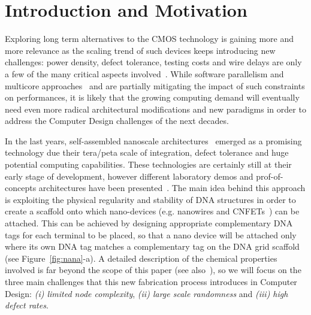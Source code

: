 
\section{Introduction and Motivation}

Exploring long term alternatives to the CMOS technology is gaining
more and more relevance as the scaling trend of such devices keeps
introducing new challenges: power density, defect tolerance, testing
costs and wire delays are only a few of the many critical aspects
involved~\cite{itrs13}. 
While software parallelism and multicore
approaches~\cite{horowitz2004} and \cite{powell2009} are partially mitigating the impact of such
constraints on performances, it is likely that the growing computing demand will
eventually need even more radical architectural modifications and new
paradigms in order to address the Computer Design challenges of the next
decades.

In the last years, self-assembled nanoscale architectures~\cite{yan2003}
emerged as a promising technology due their tera/peta scale of
integration, defect tolerance and huge potential computing
capabilities. These technologies are certainly still at
their early stage of development, however different laboratory demos and
prof-of-concepts architectures have been presented~\cite{patwardhan2004, patwardhan2006_1, pistol2009}.
The main idea behind this approach is exploiting the physical regularity and
stability of DNA structures in order to create a scaffold onto which
nano-devices (e.g. nanowires and CNFETs~\cite{bachtold2001, tans1998, cui2001}) can be
attached. This can be achieved by designing appropriate complementary DNA tags for
each terminal to be placed, so that a nano device will be attached
only where its own DNA tag matches a complementary tag on the DNA grid
scaffold (see Figure~\ref{fig:nana}-a).
A detailed description of the chemical properties involved is far
beyond the scope of this paper (see also~\cite{braun1998, seeman1999}), so we will focus on
the three main challenges that this new fabrication process introduces
in Computer Design: \emph{(i) limited node complexity}, \emph{(ii) large scale
randomness} and \emph{(iii) high defect rates}.  

